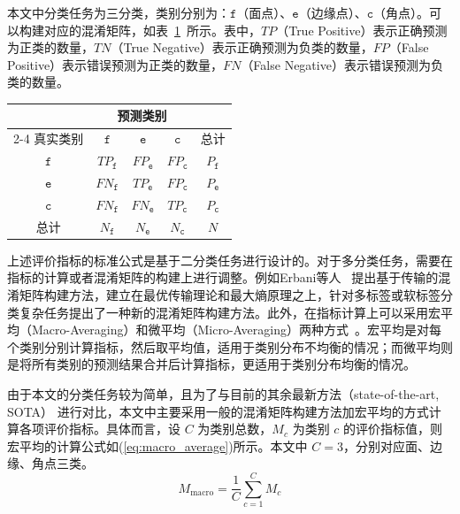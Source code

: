 本文中分类任务为三分类，类别分别为：$\mathtt{f}$（面点）、$\mathtt{e}$（边缘点）、$\mathtt{c}$（角点）。可以构建对应的混淆矩阵，如表~\ref{tab:confusion_matrix}~所示。表中，$TP$（True Positive）表示正确预测为正类的数量，$TN$（True Negative）表示正确预测为负类的数量，$FP$（False Positive）表示错误预测为正类的数量，$FN$（False Negative）表示错误预测为负类的数量。
\begin{table}[!htbp]
    \centering
    \setlength{\tabcolsep}{12pt}
    \begin{tabular}{ccccc}
        \toprule
        & \multicolumn{3}{c}{预测类别} & \\ 
        \cmidrule(lr){2-4}
        真实类别 & $\mathtt{f}$ & $\mathtt{e}$ & $\mathtt{c}$ & 总计 \\
        \midrule
        $\mathtt{f}$ & $TP_{\mathtt{f}}$ & $FP_{\mathtt{e}}$ & $FP_{\mathtt{c}}$ & $P_{\mathtt{f}}$ \\
        $\mathtt{e}$ & $FN_{\mathtt{f}}$ & $TP_{\mathtt{e}}$ & $FP_{\mathtt{c}}$ & $P_{\mathtt{e}}$ \\
        $\mathtt{c}$ & $FN_{\mathtt{f}}$ & $FN_{\mathtt{e}}$ & $TP_{\mathtt{c}}$ & $P_{\mathtt{c}}$ \\
        总计 & $N_{\mathtt{f}}$ & $N_{\mathtt{e}}$ & $N_{\mathtt{c}}$ & $N$ \\
        \bottomrule
    \end{tabular}
    \label{tab:confusion_matrix}
\end{table}

上述评价指标的标准公式是基于二分类任务进行设计的。对于多分类任务，需要在指标的计算或者混淆矩阵的构建上进行调整。例如Erbani等人~\cite{erbani_confusion_2024} 提出基于传输的混淆矩阵构建方法，建立在最优传输理论和最大熵原理之上，针对多标签或软标签分类复杂任务提出了一种新的混淆矩阵构建方法。此外，在指标计算上可以采用宏平均（Macro-Averaging）和微平均（Micro-Averaging）两种方式~\cite{krstinic_multilabel_2020, japkowicz_class_2002a}。宏平均是对每个类别分别计算指标，然后取平均值，适用于类别分布不均衡的情况；而微平均则是将所有类别的预测结果合并后计算指标，更适用于类别分布均衡的情况。

由于本文的分类任务较为简单，且为了与目前的其余最新方法（state-of-the-art, SOTA） 进行对比，本文中主要采用一般的混淆矩阵构建方法加宏平均的方式计算各项评价指标。具体而言，设 $C$ 为类别总数，$M_c$ 为类别 $c$ 的评价指标值，则宏平均的计算公式如(\ref{eq:macro_average})所示。本文中 $C=3$，分别对应面、边缘、角点三类。
\begin{equation}
    M_\text{macro} = \frac{1}{C} \sum_{c=1}^{C} M_c
    \label{eq:macro_average}
\end{equation}


